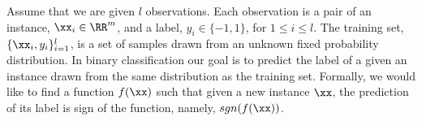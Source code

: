 


Assume that we are given $l$ observations. Each observation is a pair of 
an instance, $\xx_i\in\RR^m$, and a label, $y_i\in\{-1,1\}$, for $1 \le i \le l$.  
The training set, $\{\xx_i,y_i\}_{i=1}^l$, is a set of samples drawn from 
an unknown fixed probability distribution. In binary classification our goal
is to predict the label of a given an instance drawn from the same distribution as the training set. Formally, we would like to find a function
$f(\xx)$ such that given a new instance $\xx$,
the prediction of its label is sign of the function, namely, $sgn(f(\xx))$.

